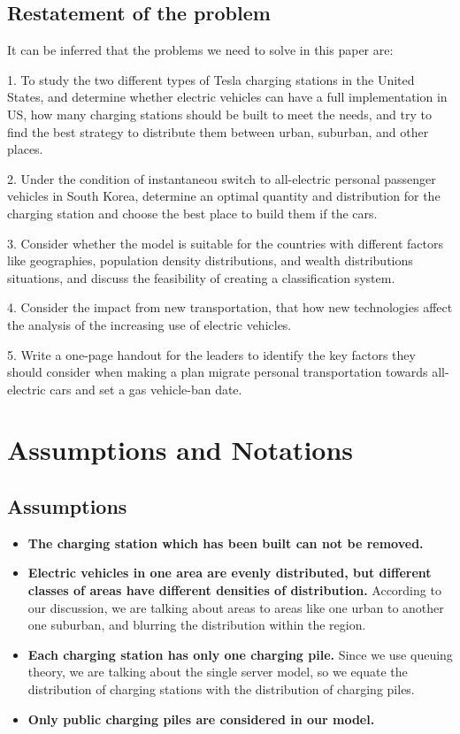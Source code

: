 \documentclass[12pt]{article}  %
\begin{document}
\subsection{Restatement of the problem}
It can be inferred that the problems we need to solve in this paper are:

1. To study the two different types of Tesla charging stations in the United States, and
determine whether electric vehicles can have a full implementation in US, how
many charging stations should be built to meet the needs, and try to find the best
strategy to distribute them between urban, suburban, and other places.

2. Under the condition of instantaneou switch to all-electric personal passenger vehicles in South Korea, determine an optimal quantity and distribution for the charging station and choose
the best place to build them if the cars.

3. Consider whether the model is suitable for the countries with different factors like geographies, population density distributions, and wealth distributions situations, and discuss the feasibility of creating a classification system.

4. Consider the impact from new transportation, that how new technologies affect the analysis of the increasing use of electric vehicles.
 
5. Write a one-page handout for the leaders to identify the key factors they should
consider when making a plan migrate personal transportation towards all-electric cars and set a gas vehicle-ban date.

\section{Assumptions and Notations}
\subsection{Assumptions}
\begin{itemize}
    \item \textbf{The charging station which has been built can not be removed.} 
    \item \textbf{Electric vehicles in one area are evenly distributed, but 
    	different classes of areas have different densities of distribution.}
    	According to our discussion, we are talking about areas to areas like one urban to another one suburban, and blurring the distribution within the region.
	\item \textbf{Each charging station has only one charging pile.}
	Since we use queuing theory, we are talking about the single server model, so we equate the distribution of charging stations with the distribution of charging piles. 
	\item \textbf{Only public charging piles are considered in our model.}
\end{itemize}
\end{document}
